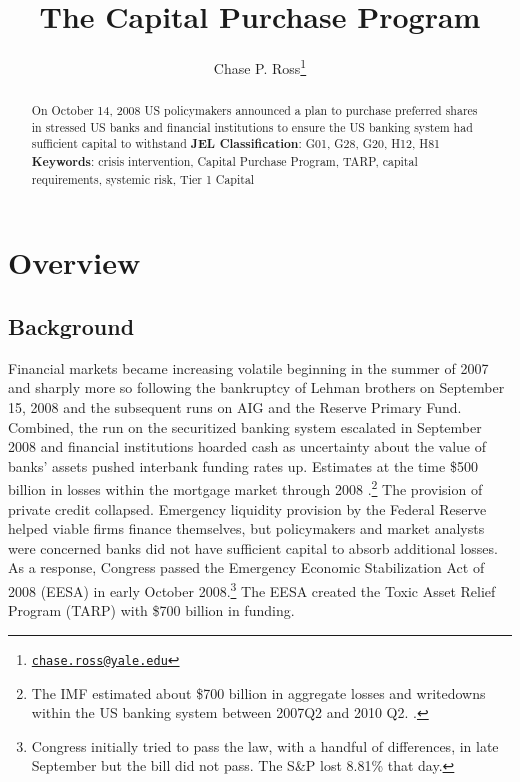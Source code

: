 \documentclass[12pt]{article}
\begin{document}
	\lhead{}
	\rhead{}
	\renewcommand{\headrulewidth}{0.0pt}
	\renewcommand{\footrulewidth}{0.0pt}

\title{The Capital Purchase Program}
\author{Chase P. Ross\thanks{\texttt{\href{mailto:chase.ross@yale.edu}{chase.ross@yale.edu}}}}
\date{}


\maketitle

\begin{abstract}
On October 14, 2008 US policymakers announced a plan to purchase preferred shares in stressed US banks and financial institutions to ensure the US banking system had sufficient capital to withstand 
\newline
\newline
\textbf{JEL Classification}: G01, G28, G20, H12, H81
\newline
\textbf{Keywords}: crisis intervention, Capital Purchase Program, TARP,  capital requirements, systemic risk, Tier 1 Capital

\end{abstract}
\newpage
\tableofcontents
\newpage

\section{Overview}

\subsection{Background}

Financial markets became increasing volatile beginning in the summer of 2007 and sharply more so following the bankruptcy of Lehman brothers on September 15, 2008 and the subsequent runs on AIG and the Reserve Primary Fund. Combined, the run on the securitized banking system escalated in September 2008 and financial institutions hoarded cash as uncertainty about the value of banks' assets pushed interbank funding rates up. Estimates at the time \$500 billion in losses within the mortgage market through 2008 \citep{Greenlaw}.\footnote{The IMF estimated about \$700 billion in aggregate losses and writedowns within the US banking system between 2007Q2 and 2010 Q2. \citep{IMF2010}.} The provision of private credit collapsed. Emergency liquidity provision by the Federal Reserve helped viable firms finance themselves, but policymakers and market analysts were concerned banks did not have sufficient capital to absorb additional  losses. As a response, Congress passed the Emergency Economic Stabilization Act of 2008 (EESA) in early October 2008.\footnote{Congress initially tried to pass the law, with a handful of differences, in late September but the bill did not pass. The S\&P lost 8.81\% that day.} The EESA created the Toxic Asset Relief Program (TARP) with \$700 billion in funding.
\end{document}
